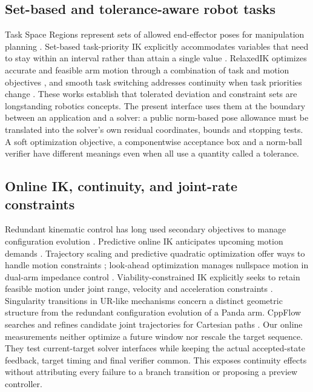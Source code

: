 \documentclass[10pt,a4paper]{article}
\begin{document}
\subsection{Set-based and tolerance-aware robot tasks}

Task Space Regions represent sets of allowed end-effector poses for manipulation
planning \cite{berenson2011tsr}. Set-based task-priority IK explicitly accommodates
variables that need to stay within an interval rather than attain a single value
\cite{moe2016setbased}. RelaxedIK optimizes accurate and feasible arm motion through
a combination of task and motion objectives \cite{rakita2018relaxedik}, and smooth
task switching addresses continuity when task priorities change
\cite{gamper2024switching}. These works establish that tolerated deviation and
constraint sets are longstanding robotics concepts. The present interface uses
them at the boundary between an application and a solver: a public norm-based
pose allowance must be translated into the solver's own residual coordinates,
bounds and stopping tests. A soft optimization objective, a componentwise
acceptance box and a norm-ball verifier have different meanings even when all
use a quantity called a tolerance.

\subsection{Online IK, continuity, and joint-rate constraints}

Redundant kinematic control has long used secondary objectives to manage
configuration evolution \cite{siciliano1990tutorial}.
Predictive online IK anticipates upcoming motion demands
\cite{schuetz2014predictive}. Trajectory scaling and predictive quadratic
optimization offer ways to handle motion constraints
\cite{wolinski2024scaling,wolinski2025predictive};
look-ahead optimization manages nullspace motion in dual-arm impedance control
\cite{origanti2025lookahead}. Viability-constrained IK explicitly seeks to retain
feasible motion under joint range, velocity and acceleration constraints
\cite{zhang2026viability}. Singularity transitions in UR-like mechanisms
\cite{boschi2026singularity} concern a distinct geometric structure from the
redundant configuration evolution of a Panda arm.
CppFlow searches and refines candidate joint trajectories for Cartesian paths
\cite{morgan2024cppflow}. Our online measurements neither optimize a future
window nor rescale the target sequence. They test current-target solver
interfaces while keeping the actual accepted-state feedback, target timing
and final verifier common. This exposes continuity effects without attributing
every failure to a branch transition or proposing a preview controller.
\end{document}
